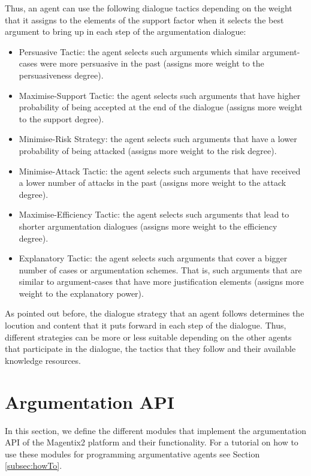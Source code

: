 Thus, an agent can use the following dialogue tactics depending on the weight that it assigns to the elements of the support factor when it selects the best argument to bring up in each step of the argumentation dialogue:

\begin{itemize}
 \item Persuasive Tactic: the agent selects such arguments which similar argument-cases were more persuasive in the past (assigns more weight to the persuasiveness degree).
 \item Maximise-Support Tactic: the agent selects such arguments that have higher probability of being accepted at the end of the dialogue (assigns more weight to the support degree).
 \item Minimise-Risk Strategy: the agent selects such arguments that have a lower probability of being attacked (assigns more weight to the risk degree).
 \item Minimise-Attack Tactic: the agent selects such arguments that have received a lower number of attacks in the past (assigns more weight to the attack degree).
 \item Maximise-Efficiency Tactic: the agent selects such arguments that lead to shorter argumentation dialogues (assigns more weight to the efficiency degree).
 \item Explanatory Tactic: the agent selects such arguments that cover a bigger number of cases or argumentation schemes. That is, such arguments that are similar to argument-cases that have more justification elements (assigns more weight to the explanatory power).
\end{itemize}

As pointed out before, the dialogue strategy that an agent follows determines the locution and content that it puts forward in each step of the dialogue. Thus, different strategies can be more or less suitable depending on the other agents that participate in the dialogue, the tactics that they follow and their available knowledge resources.

\section{Argumentation API}
\label{subsec:implementation}
In this section, we define the different modules that implement the argumentation API of the Magentix2 platform and their functionality. For a tutorial on how to use these modules for programming argumentative agents see Section \ref{subsec:howTo}.

